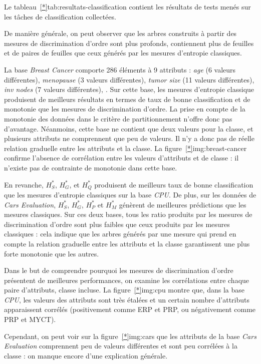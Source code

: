 \documentclass[a4paper]{article}
\newcommand{\figref}[1]{figure~\ref{#1}}
\newcommand{\tabref}[1]{tableau~\ref{#1}}
\begin{document}
Le \tabref*{tab:resultats-classification} contient les résultats de tests menés
sur les tâches de classification collectées.

De manière générale, on peut observer que les arbres construits à partir des
mesures de discrimination d'ordre sont plus profonds, contiennent plus de
feuilles et de paires de feuilles que ceux générés par les mesures d'entropie
classiques. 

La base \emph{Breast Cancer} comporte 286 éléments à 9 attributs : \emph{age} (6
valeurs différentes), \emph{menopause} (3 valeurs différentes), \emph{tumor
size} (11 valeurs différentes), \emph{inv nodes} (7 valeurs différentes), \emph. Sur cette base, les mesures d'entropie classique produisent
de meilleurs résultats en termes de taux de bonne classification et de monotonie
que les mesures de discrimination d'ordre. La prise en compte de la monotonie
des données dans le critère de partitionnement n'offre donc pas d'avantage.
Néanmoins, cette base ne contient que deux valeurs pour la classe, et plusieurs
attributs ne comprennent que peu de valeurs. Il n'y a donc pas de réelle
relation graduelle entre les attributs et la classe. La \figref*{img:breast-cancer}
confirme l'absence de corrélation entre les valeurs d'attributs et de classe :
il n'existe pas de contrainte de monotonie dans cette base.

En revanche, $H^*_S$, $H^*_G$, et $H^*_Q$ produisent de meilleurs taux de bonne
classification que les mesures d'entropie classiques sur la base \emph{CPU}.
De plus, sur les données de \emph{Cars Evaluation}, $H^*_S$, $H^*_G$, $H^*_P$
et $H^*_M$ génèrent de meilleures prédictions que les mesures classiques. Sur
ces deux bases, tous les ratio produits par les mesures de discrimination
d'ordre sont plus faibles que ceux produits par les mesures classiques : cela
indique que les arbres générés par une mesure qui prend en compte la relation
graduelle entre les attributs et la classe garantissent une plus forte monotonie
que les autres.

Dans le but de comprendre pourquoi les mesures de discrimination d'ordre
présentent de meilleures performances, on examine les corrélations entre chaque
paire d'attributs, classe incluse. La \figref*{img:cpu} montre que, dans la base
\emph{CPU}, les valeurs des attributs sont très étalées et un certain nombre
d'attributs apparaissent corrélés (positivement comme ERP et PRP, ou
négativement comme PRP et MYCT).

Cependant, on peut voir sur la \figref*{img:cars} que les attributs de la base
\emph{Cars Evaluation} comprennent peu de valeurs différentes et sont peu
corrélées à la classe : on manque encore d'une explication générale. \\
\end{document}
